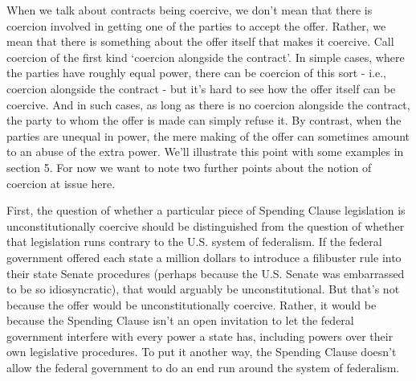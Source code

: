 \documentclass[
  11pt,
  letterpaper,
  DIV=11,
  numbers=noendperiod,
  oneside]{scrartcl}
\begin{document}
When we talk about contracts being coercive, we don't mean that there is
coercion involved in getting one of the parties to accept the offer.
Rather, we mean that there is something about the offer itself that
makes it coercive. Call coercion of the first kind `coercion alongside
the contract'. In simple cases, where the parties have roughly equal
power, there can be coercion of this sort - i.e., coercion alongside the
contract - but it's hard to see how the offer itself can be coercive.
And in such cases, as long as there is no coercion alongside the
contract, the party to whom the offer is made can simply refuse it. By
contrast, when the parties are unequal in power, the mere making of the
offer can sometimes amount to an abuse of the extra power. We'll
illustrate this point with some examples in section 5. For now we want
to note two further points about the notion of coercion at issue here.

First, the question of whether a particular piece of Spending Clause
legislation is unconstitutionally coercive should be distinguished from
the question of whether that legislation runs contrary to the U.S.
system of federalism. If the federal government offered each state a
million dollars to introduce a filibuster rule into their state Senate
procedures (perhaps because the U.S. Senate was embarrassed to be so
idiosyncratic), that would arguably be unconstitutional. But that's not
because the offer would be unconstitutionally coercive. Rather, it would
be because the Spending Clause isn't an open invitation to let the
federal government interfere with every power a state has, including
powers over their own legislative procedures. To put it another way, the
Spending Clause doesn't allow the federal government to do an end run
around the system of federalism.
\end{document}
